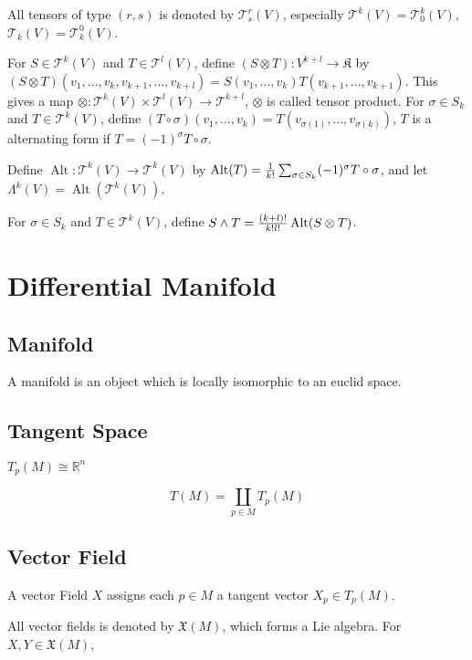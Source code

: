 \documentclass{article}
\newcommand{\alt}{\mathop{\mathrm{Alt}}}
\begin{document}
All tensors of type $(r, s)$ is denoted by $\mathcal T^r_s(V)$,
especially $\mathcal T^k(V) = \mathcal T^k_0(V)$,
$\mathcal T_k(V) = \mathcal T^0_k(V)$.


For $S \in \mathcal T^k(V)$ and $T \in \mathcal T^l(V)$,
define $(S \otimes T) : V^{k + l} \to \mathfrak K$ by 
$(S \otimes T)(v_1, \dots, v_k, v_{k+1}, \dots, v_{k+l})
= S(v_1, \dots, v_k)T(v_{k+1}, \dots, v_{k+1})$.
This gives a map $\otimes : \mathcal T^k(V) \times \mathcal T^l(V) \to \mathcal T^{k+l}$,
$\otimes$ is called tensor product.
For $\sigma \in S_k$ and $T \in \mathcal T^k(V)$,
define $(T \circ \sigma)(v_1, \dots, v_k) = T(v_{\sigma(1)}, \dots, v_{\sigma(k)})$,
$T$ is a alternating form if $T = (-1)^\sigma T \circ \sigma$.

Define $\alt : \mathcal T^k(V) \to \mathcal T^k(V)$ by
$\alt(T) = {1 \over k!} \sum_{\sigma \in S_k} (-1)^\sigma T \circ \sigma$,
and let $\Lambda^k(V) = \alt(\mathcal T^k(V))$.

For $\sigma \in S_k$ and $T \in \mathcal T^k(V)$,
define $S \wedge T = {(k + l)! \over k! l!} \alt(S \otimes T)$.


\section{Differential Manifold}

\subsection{Manifold}
A manifold is an object which is locally isomorphic to an euclid space.

\subsection{Tangent Space}

$T_p(M) \cong \mathbb R^n$

$$T(M) = \coprod_{p \in M} T_p(M)$$


\subsection{Vector Field}
A vector Field $X$ assigns each $p \in M$
a tangent vector $X_p \in T_p(M)$.

All vector fields is denoted by $\mathfrak X(M)$,
which forms a Lie algebra.
For $X, Y \in \mathfrak X(M)$,
\end{document}
